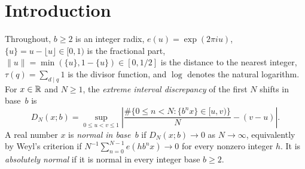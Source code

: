 \documentclass[11pt]{article}
\newcommand{\dist}[1]{\lVert #1\rVert}
\newcommand{\fr}[1]{\{#1\}}
\newcommand{\Hmeas}{\mathcal{H}}
\newcommand{\rhoK}{\rho_{\mathrm{Klo}}}
\begin{document}
\begin{abstract}
Conversely, exact rational upper transfer-operator certificates prove that $\Hmeas^{9/10}(F_7)=0$, $\Hmeas^{17/18}(F_{12})=0$, and $\Hmeas^{5/6}(F_4)=0$, excluding $M\le7$ for \emph{any} measure on the Weil--Estermann route (establishing $M=8$ as optimal for this architecture), $M\le12$ on the elementary route ($M=13$ remains open), and $M\le4$ for any rectangle-count exponent $\rhoK\ge0$. Reaching the classical existence cap $M=2$ therefore requires a genuinely different Fourier-decay mechanism. We repair a zero-weight defect in naive block-weight searches via the exact integer condition $D^Q\ge B_{M,L}^P$, quantify the tree branching complexity ($10^{395}$ children per step at $M=14$, $L=344$ and $10^{205}$ at $M=8$, $L=226$, versus $3.1\times10^6$ at $M=42$, $L=4$ and $900$ at $M=30$, $L=2$), emphasize that the algorithm is computable in principle only and yields no discrepancy rate for $P(x)$, and record an all-prime full-density series corollary alongside a representation lemma clarifying that persistent off-radix prime support carries no intrinsic constraint. All proofs are written arguments backed where stated by exact integer/rational finite certificates; no result here is formalized in Lean~4.
\end{abstract}

\section{Introduction}\label{sec:intro}

Throughout, $b\ge2$ is an integer radix, $e(u)=\exp(2\pi i u)$, $\fr{u}=u-\lfloor u\rfloor\in[0,1)$ is the fractional part, $\dist{u}=\min(\fr{u},1-\fr{u})\in[0,1/2]$ is the distance to the nearest integer, $\tau(q)=\sum_{d\mid q}1$ is the divisor function, and $\log$ denotes the natural logarithm. For $x\in\mathbb R$ and $N\ge1$, the \emph{extreme interval discrepancy} of the first $N$ shifts in base~$b$ is
\[
D_N(x;b)=\sup_{0\le u<v\le1}\left|\frac{\#\{0\le n<N:\fr{b^nx}\in[u,v)\}}{N}-(v-u)\right|.
\]
A real number $x$ is \emph{normal in base~$b$} if $D_N(x;b)\to0$ as $N\to\infty$, equivalently by Weyl's criterion \cite[Chapter~1]{KN} if $N^{-1}\sum_{n=0}^{N-1}e(hb^nx)\to0$ for every nonzero integer $h$. It is \emph{absolutely normal} if it is normal in every integer base $b\ge2$.
\end{document}
